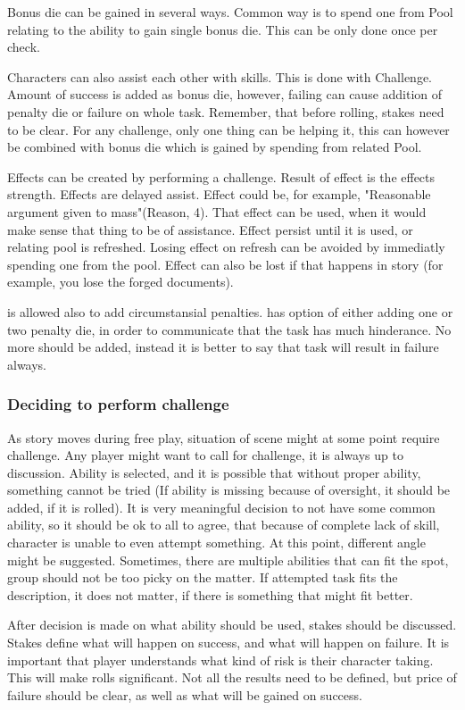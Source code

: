 Bonus die can be gained in several ways.
Common way is to spend one from Pool relating to the ability to gain single bonus die.
This can be only done once per check.

Characters can also assist each other with skills.
This is done with Challenge.
Amount of success is added as bonus die, however, failing can cause addition of penalty die or failure on whole task.
Remember, that before rolling, stakes need to be clear.
For any challenge, only one thing can be helping it, this can however be combined with bonus die which is gained by spending from related Pool.

Effects can be created by performing a challenge.
Result of effect is the effects strength.
Effects are delayed assist.
Effect could be, for example, "Reasonable argument given to mass"(Reason, 4).
That effect can be used, when it would make sense that thing to be of assistance.
Effect persist until it is used, or relating pool is refreshed.
Losing effect on refresh can be avoided by immediatly spending one from the pool.
Effect can also be lost if that happens in story (for example, you lose the forged documents).

\GM{} is allowed also to add circumstansial penalties.
\GM{} has option of either adding one or two penalty die, in order to communicate that the task has much hinderance.
No more should be added, instead it is better to say that task will result in failure always.

\subsubsection{Deciding to perform challenge}
As story moves during free play, situation of scene might at some point require challenge.
Any player might want to call for challenge, it is always up to discussion.
Ability is selected, and it is possible that without proper ability, something cannot be tried (If ability is missing because of oversight, it should be added, if it is rolled).
It is very meaningful decision to not have some common ability, so it should be ok to all to agree, that because of complete lack of skill, character is unable to even attempt something.
At this point, different angle might be suggested.
Sometimes, there are multiple abilities that can fit the spot, group should not be too picky on the matter.
If attempted task fits the description, it does not matter, if there is something that might fit better.

After decision is made on what ability should be used, stakes should be discussed.
Stakes define what will happen on success, and what will happen on failure.
It is important that player understands what kind of risk is their character taking.
This will make rolls significant.
Not all the results need to be defined, but price of failure should be clear, as well as what will be gained on success.

